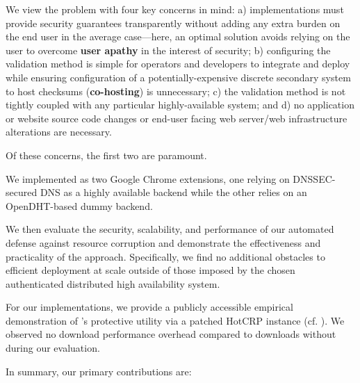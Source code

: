 We view the problem with four key concerns in mind: a) implementations must
provide security guarantees transparently without adding any extra burden on the
end user in the average case---here, an optimal solution avoids relying on the
user to overcome \textbf{user apathy} in the interest of security; b)
configuring the validation method is simple for operators and developers to
integrate and deploy while ensuring configuration of a potentially-expensive
discrete secondary system to host checksums (\ie \textbf{co-hosting}) is
unnecessary; c) the validation method is not tightly coupled with any particular
highly-available system; and d) no application or website source code changes or
end-user facing web server/web infrastructure alterations are necessary.

Of these concerns, the first two are paramount.

We implemented \SYSTEM{} as two Google Chrome extensions, one
relying on DNSSEC-secured DNS as a highly available backend while the other
relies on an OpenDHT-based dummy backend.

We then evaluate the security, scalability, and performance of our automated
defense against resource corruption and demonstrate the effectiveness and
practicality of the \SYSTEM{} approach. Specifically, we find no additional
obstacles to efficient deployment at scale outside of those imposed by the
chosen authenticated distributed high availability system.

For our implementations, we provide a publicly accessible
empirical demonstration of \SYSTEM{}'s protective utility via a patched HotCRP
instance (cf. ). We observed no download performance
overhead compared to downloads without \SYSTEM{} during our evaluation.

In summary, our primary contributions are:


